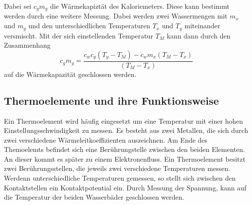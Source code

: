 Dabei sei $c_gm_g$ die Wärmekapiztät des Kaloriemeters.
Diese kann bestimmt werden durch eine weitere Messung. 
Dabei werden zwei Wassermengen mit $m_x$ und $m_y$ und den 
unterschiedlichen Temperaturen $T_x$ und $T_y$ miteinander versmischt.
Mit der sich einstellenden Temperatur $T_M$ kann dann
durch den Zusammenhang
\begin{equation}
\label{eq:zusammenhang_cgmg}
c_gm_g=\frac{c_wc_y\left(T_y-T_M\right)-c_wm_x\left(T_M-T_x\right)}{\left(T_M-T_x\right)}
\end{equation}
auf die Wärmekapazität geschlossen werden.

\subsection{Thermoelemente und ihre Funktionsweise} %

Ein Thermoelement wird häufig eingesetzt um eine  
Temperatur mit einer hohen Einstellungsschwindigkeit zu messen.
Es besteht aus zwei Metallen, die sich durch zwei 
verschiedene Wärmeleitkoeffizienten auszeichnen.
Am Ende des Themoelemts befindet sich eine Berührungstelle zwischen 
den beiden Elementen.
An dieser kommt es später zu einem Elektronenfluss.
Ein Thermoelement besitzt zwei Berührungsstellen, die 
jeweils zwei verschiedene Temperaturen messen.
Werdenn unterschiedliche Temperaturen gemessen, so 
stellt sich zwischen den Kontaktstellen ein Kontaktpotential 
ein. 
Durch Messung der Spannung, kann auf die 
Temperatur der beiden Wasserbäder geschlossen werden.





